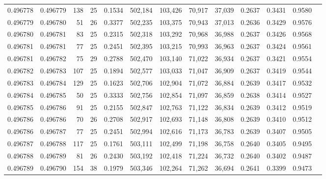 \begin{tabular}{rrrrrrrrrrrrr}
0.496778 & 0.496779 & 138 &  25 &                                     0.1534 & 502,184 & 103,426 &  70,917 &  37,039 & 0.2637 & 0.3431 & 0.9580 \\
0.496779 & 0.496780 &  51 &  26 &                                     0.3377 & 502,235 & 103,375 &  70,943 &  37,013 & 0.2636 & 0.3429 & 0.9576 \\
0.496780 & 0.496781 &  83 &  25 &                                     0.2315 & 502,318 & 103,292 &  70,968 &  36,988 & 0.2637 & 0.3426 & 0.9568 \\
0.496781 & 0.496781 &  77 &  25 &                                     0.2451 & 502,395 & 103,215 &  70,993 &  36,963 & 0.2637 & 0.3424 & 0.9561 \\
0.496781 & 0.496782 &  75 &  29 &                                     0.2788 & 502,470 & 103,140 &  71,022 &  36,934 & 0.2637 & 0.3421 & 0.9554 \\
0.496782 & 0.496783 & 107 &  25 &                                     0.1894 & 502,577 & 103,033 &  71,047 &  36,909 & 0.2637 & 0.3419 & 0.9544 \\
0.496783 & 0.496784 & 129 &  25 &                                     0.1623 & 502,706 & 102,904 &  71,072 &  36,884 & 0.2639 & 0.3417 & 0.9532 \\
0.496784 & 0.496785 &  50 &  25 &                                     0.3333 & 502,756 & 102,854 &  71,097 &  36,859 & 0.2638 & 0.3414 & 0.9527 \\
0.496785 & 0.496786 &  91 &  25 &                                     0.2155 & 502,847 & 102,763 &  71,122 &  36,834 & 0.2639 & 0.3412 & 0.9519 \\
0.496786 & 0.496786 &  70 &  26 &                                     0.2708 & 502,917 & 102,693 &  71,148 &  36,808 & 0.2639 & 0.3410 & 0.9512 \\
0.496786 & 0.496787 &  77 &  25 &                                     0.2451 & 502,994 & 102,616 &  71,173 &  36,783 & 0.2639 & 0.3407 & 0.9505 \\
0.496787 & 0.496788 & 117 &  25 &                                     0.1761 & 503,111 & 102,499 &  71,198 &  36,758 & 0.2640 & 0.3405 & 0.9495 \\
0.496788 & 0.496789 &  81 &  26 &                                     0.2430 & 503,192 & 102,418 &  71,224 &  36,732 & 0.2640 & 0.3402 & 0.9487 \\
0.496789 & 0.496790 & 154 &  38 &                                     0.1979 & 503,346 & 102,264 &  71,262 &  36,694 & 0.2641 & 0.3399 & 0.9473 \\

\end{tabular}
